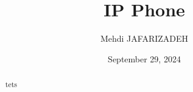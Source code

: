 \documentclass[11pt,a4paper]{article}
\title{IP Phone}
\author{Mehdi JAFARIZADEH}
\date{September 29, 2024}
\begin{document}
\maketitle

\begin{abstract}
    tets
\end{abstract}

\newpage


\newpage

\begin{multicols}{2}
  \small
  
  \makeatletter
\renewcommand\@biblabel[1]{#1.} 
  
 
  \end{multicols}
\end{document}
